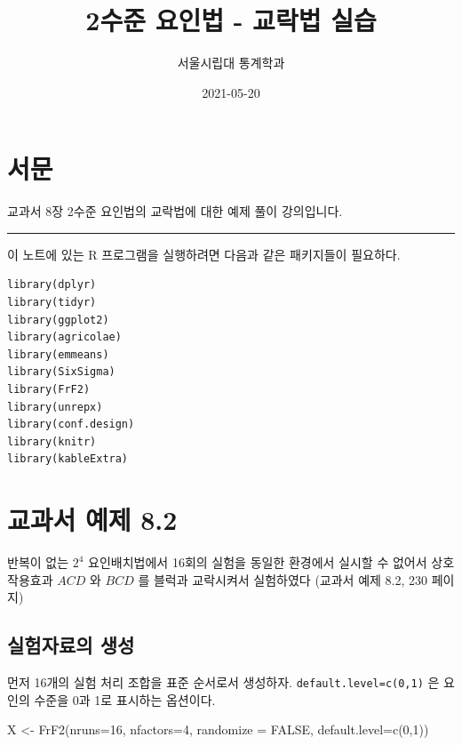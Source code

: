 \documentclass[
]{book}
\title{2수준 요인법 - 교락법 실습}
\author{서울시립대 통계학과}
\date{2021-05-20}
\newenvironment{Shaded}{\begin{snugshade}}{\end{snugshade}}
\newcommand{\AttributeTok}[1]{\textcolor[rgb]{0.77,0.63,0.00}{#1}}
\newcommand{\ConstantTok}[1]{\textcolor[rgb]{0.00,0.00,0.00}{#1}}
\newcommand{\DecValTok}[1]{\textcolor[rgb]{0.00,0.00,0.81}{#1}}
\newcommand{\FunctionTok}[1]{\textcolor[rgb]{0.00,0.00,0.00}{#1}}
\newcommand{\NormalTok}[1]{#1}
\newcommand{\OtherTok}[1]{\textcolor[rgb]{0.56,0.35,0.01}{#1}}
\begin{document}
\maketitle

{
\setcounter{tocdepth}{1}
\tableofcontents
}
\hypertarget{uxc11cuxbb38}{%
\chapter*{서문}\label{uxc11cuxbb38}}


교과서 8장 2수준 요인법의 교락법에 대한 예제 풀이 강의입니다.

\begin{center}\rule{0.5\linewidth}{0.5pt}\end{center}

이 노트에 있는 R 프로그램을 실행하려면 다음과 같은 패키지들이 필요하다.

\begin{verbatim}
library(dplyr)
library(tidyr)
library(ggplot2)
library(agricolae)
library(emmeans)
library(SixSigma)
library(FrF2)
library(unrepx)
library(conf.design)
library(knitr)
library(kableExtra)
\end{verbatim}

\mainmatter

\hypertarget{ex82}{%
\chapter{교과서 예제 8.2}\label{ex82}}

반복이 없는 \(2^4\) 요인배치법에서 16회의 실험을 동일한 환경에서 실시할 수 없어서 상호작용효과 \(ACD\) 와 \(BCD\) 를 블럭과 교락시켜서 실험하였다 (교과서 예제 8.2, 230 페이지)

\hypertarget{uxc2e4uxd5d8uxc790uxb8ccuxc758-uxc0dduxc131}{%
\section{실험자료의 생성}\label{uxc2e4uxd5d8uxc790uxb8ccuxc758-uxc0dduxc131}}

먼저 16개의 실험 처리 조합을 표준 순서로서 생성하자. \texttt{default.level=c(0,1)} 은 요인의 수준을
0과 1로 표시하는 옵션이다.

\begin{Shaded}
\begin{Highlighting}[]
\NormalTok{X }\OtherTok{\textless{}{-}} \FunctionTok{FrF2}\NormalTok{(}\AttributeTok{nruns=}\DecValTok{16}\NormalTok{, }\AttributeTok{nfactors=}\DecValTok{4}\NormalTok{, }\AttributeTok{randomize =} \ConstantTok{FALSE}\NormalTok{,  }\AttributeTok{default.level=}\FunctionTok{c}\NormalTok{(}\DecValTok{0}\NormalTok{,}\DecValTok{1}\NormalTok{))}
\end{Highlighting}
\end{Shaded}
\end{document}
